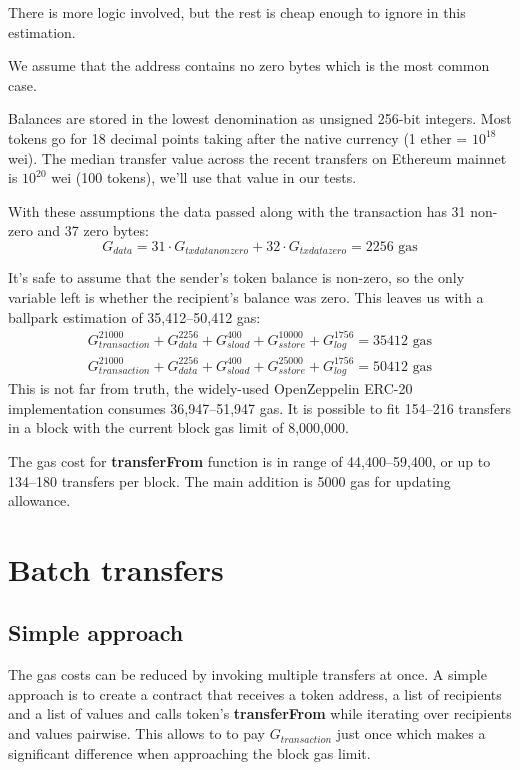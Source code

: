 \documentclass[12pt]{article}
\begin{document}
There is more logic involved, but the rest is cheap enough to ignore in this estimation.

We assume that the address contains no zero bytes which is the most common case.

Balances are stored in the lowest denomination as unsigned 256-bit integers.
Most tokens go for 18 decimal points taking after the native currency (1 ether = $10^{18}$ wei).
The median transfer value across the recent transfers on Ethereum mainnet is $10^{20}$ wei (100 tokens), we'll use that value in our tests.

With these assumptions the data passed along with the transaction has 31 non-zero and 37 zero bytes:
\begin{equation}
	G_{data} = 31 \cdot G_{txdatanonzero} + 32 \cdot G_{txdatazero} = 2256 \text{ gas}
\end{equation}

It's safe to assume that the sender's token balance is non-zero, so the only variable left is whether the recipient's balance was zero.
This leaves us with a ballpark estimation of 35,412--50,412 gas:
\begin{gather}
	G_{transaction}^{21000} + G_{data}^{2256} + G_{sload}^{400} + G_{sstore}^{10000} + G_{log}^{1756} = 35412 \text{ gas} \\
	G_{transaction}^{21000} + G_{data}^{2256} + G_{sload}^{400} + G_{sstore}^{25000} + G_{log}^{1756} = 50412 \text{ gas}
\end{gather}
%
This is not far from truth, the widely-used OpenZeppelin\cite{openzeppelin} ERC-20 implementation consumes 36,947--51,947 gas.
It is possible to fit 154--216 transfers in a block with the current block gas limit of  8,000,000.

The gas cost for \textbf{transferFrom} function is in range of 44,400--59,400, or up to 134--180 transfers per block. The main addition is 5000 gas for updating allowance.

\section{Batch transfers}
\subsection{Simple approach}

The gas costs can be reduced by invoking multiple transfers at once.
A simple approach is to create a contract that receives a token address, a list of recipients and a list of values and calls token's \textbf{transferFrom} while iterating over recipients and values pairwise. 
This allows to to pay $G_{transaction}$ just once which makes a significant difference when approaching the block gas limit.
\end{document}
